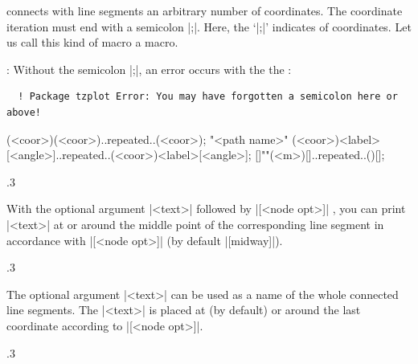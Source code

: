 \icmd{\tzlines} connects with line segments an arbitrary number of coordinates. The coordinate iteration must end with a semicolon |;|.
Here, the  `|;|' indicates  of coordinates.
Let us call this kind of macro a  macro. 

\remark: Without the semicolon |;|, an error occurs with the the :
  \begin{verbatim}
  ! Package tzplot Error: You may have forgotten a semicolon here or above!
  \end{verbatim}

\begin{tzdef}{}
\tzlines[<opt>](<coor>)(<coor>)..repeated..(<coor>);
\tzlines[<opt>]"<path name>"
        (<coor>){<label>}[<angle>]..repeated..(<coor>){<label>}[<angle>];
  []""(<m>){}[]..repeated..(){}[];
\end{tzdef}


\begin{tzcode}{.3}
\end{tzcode}

With the optional argument |{<text>}| followed by |[<node opt>]| , you can print |{<text>}| at or around the middle point of the corresponding line segment in accordance with |[<node opt>]| (by default |[midway]|).

\begin{tzcode}{.3}
\end{tzcode}

The optional argument |{<text>}|  can be used as a name of the whole connected line segments. The |{<text>}| is placed at (by default) or around the last coordinate according to |[<node opt>]|.

\begin{tzcode}{.3}
\end{tzcode}

